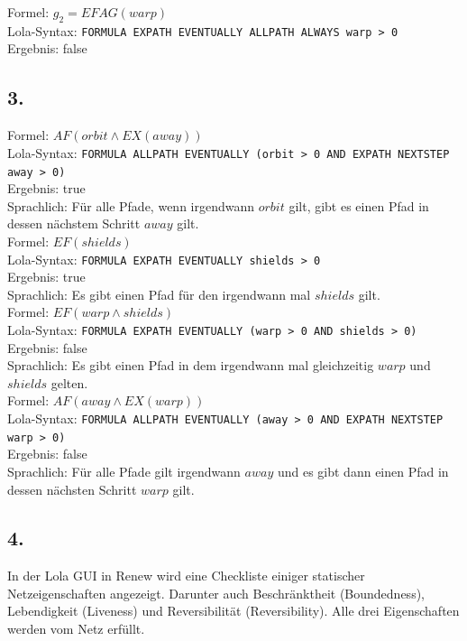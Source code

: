 \documentclass[12pt, paper=a4]{article}
\begin{document}
Formel: $g_2 = EFAG(warp)$\\
Lola-Syntax: \texttt{FORMULA EXPATH EVENTUALLY ALLPATH ALWAYS warp > 0}\\
Ergebnis: false\\

\subsection*{3.}
Formel: $AF(orbit \land EX(away))$\\
Lola-Syntax: \texttt{FORMULA ALLPATH EVENTUALLY (orbit > 0 AND EXPATH NEXTSTEP away > 0)}\\
Ergebnis: true\\
Sprachlich: Für alle Pfade, wenn irgendwann $orbit$ gilt, gibt es einen Pfad in dessen nächstem Schritt $away$ gilt.\\

Formel: $EF(shields)$\\
Lola-Syntax: \texttt{FORMULA EXPATH EVENTUALLY shields > 0}\\
Ergebnis: true\\
Sprachlich: Es gibt einen Pfad für den irgendwann mal $shields$ gilt.\\

Formel: $EF(warp \land shields)$\\
Lola-Syntax: \texttt{FORMULA EXPATH EVENTUALLY (warp > 0 AND shields > 0)}\\
Ergebnis: false\\
Sprachlich: Es gibt einen Pfad in dem irgendwann mal gleichzeitig $warp$ und $shields$ gelten.\\

Formel: $AF(away \land EX(warp))$\\
Lola-Syntax: \texttt{FORMULA ALLPATH EVENTUALLY (away > 0 AND EXPATH NEXTSTEP warp > 0)}\\
Ergebnis: false\\
Sprachlich: Für alle Pfade gilt irgendwann $away$ und es gibt dann einen Pfad in dessen nächsten Schritt $warp$ gilt.\\

\subsection*{4.}
In der Lola GUI in Renew wird eine Checkliste einiger statischer Netzeigenschaften angezeigt. Darunter auch Beschränktheit (Boundedness), Lebendigkeit (Liveness) und Reversibilität (Reversibility). Alle drei Eigenschaften werden vom Netz erfüllt.\\
\end{document}
